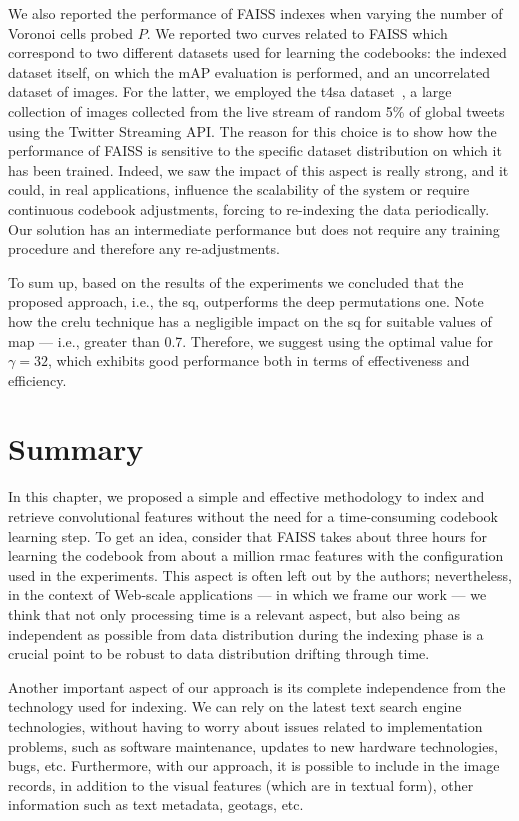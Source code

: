 We also reported the performance of FAISS indexes when varying the number of Voronoi cells probed $P$.
We reported two curves related to FAISS which correspond to two different datasets used for learning the codebooks: the indexed dataset itself, on which the mAP evaluation is performed, and an uncorrelated dataset of images.
For the latter, we employed the \gls{t4sa} dataset~\cite{vadicamo2017cross}, a large collection of images collected from the live stream of random 5\% of global tweets using the Twitter Streaming API.
The reason for this choice is to show how the performance of FAISS is sensitive to the specific dataset distribution on which it has been trained.
Indeed, we saw the impact of this aspect is really strong, and it could, in real applications, influence the scalability of the system or require continuous codebook adjustments, forcing to re-indexing the data periodically.
Our solution has an intermediate performance but does not require any training procedure and therefore any re-adjustments.

To sum up, based on the results of the experiments we concluded that the proposed approach, i.e., the \gls{sq}, outperforms the deep permutations one.
Note how the \gls{crelu} technique has a negligible impact on the \gls{sq} for suitable values of \gls{map} --- i.e., greater than 0.7.
Therefore, we suggest using the optimal value for $\gamma=32$, which exhibits good performance both in terms of effectiveness and efficiency.


\section{Summary}
\label{sec:str:conclusion}
In this chapter, we proposed a simple and effective methodology to index and retrieve convolutional features without the need for a time-consuming codebook learning step.
To get an idea, consider that FAISS takes about three hours for learning the codebook from about a million \gls{rmac} features with the configuration used in the experiments.
This aspect is often left out by the authors;
nevertheless, in the context of Web-scale applications --- in which we frame our work --- we think that not only processing time is a relevant aspect, but also being as independent as possible from data distribution during the indexing phase is a crucial point to be robust to data distribution drifting through time.

Another important aspect of our approach is its complete independence from the technology used for indexing.
We can rely on the latest text search engine technologies, without having to worry about issues related to implementation problems, such as software maintenance, updates to new hardware technologies, bugs, etc.
Furthermore, with our approach, it is possible to include in the image records, in addition to the visual features (which are in textual form), other information such as text metadata, geotags, etc.
